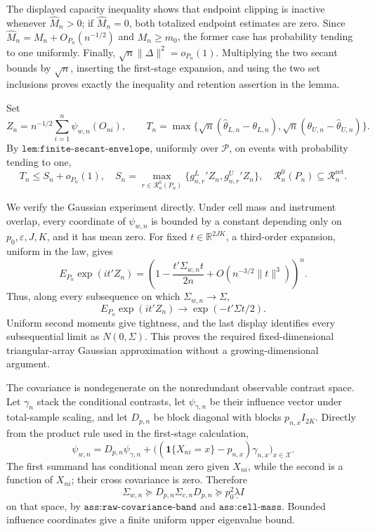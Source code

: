 The displayed capacity inequality shows that endpoint clipping is inactive whenever \(\widehat M_n>0\); if \(\widehat M_n=0\), both totalized endpoint estimates are zero. Since \(\widehat M_n=M_n+O_{P_n}(n^{-1/2})\) and \(M_n\ge m_0\), the former case has probability tending to one uniformly. Finally,
\(\sqrt n\lVert\Delta\rVert^2=o_{P_n}(1)\). Multiplying the two secant bounds by \(\sqrt n\), inserting the first-stage expansion, and using the two set inclusions proves exactly the inequality and retention assertion in the lemma.

Set
\[
 Z_n=n^{-1/2}\sum_{i=1}^n\psi_{w,n}(O_{ni}),
 \qquad
 T_n=\max\{\sqrt n(\widehat\theta_{L,n}-\theta_{L,n}),
              \sqrt n(\theta_{U,n}-\widehat\theta_{U,n})\}.
\]
By \(\texttt{lem:finite-secant-envelope}\), uniformly over \(\mathcal P\), on events with probability tending to one,
\[
 T_n\le S_n+o_{P_n}(1),
 \quad
 S_n=\max_{r\in\mathcal R_n^0(P_n)}
 \{g^L_{n,r}{}'Z_n,g^U_{n,r}{}'Z_n\},
 \quad
 \mathcal R_n^0(P_n)\subseteq\mathcal R_n^{\mathrm{ret}}.
\]

We verify the Gaussian experiment directly. Under cell mass and instrument overlap, every coordinate of \(\psi_{w,n}\) is bounded by a constant depending only on \(p_0,\varepsilon,J,K\), and it has mean zero. For fixed \(t\in\mathbb R^{2JK}\), a third-order expansion, uniform in the law, gives
\[
 E_{P_n}\exp(i t'Z_n)
 =\left(1-\frac{t'\Sigma_{w,n}t}{2n}
          +O(n^{-3/2}\lVert t\rVert^3)\right)^n.
\]
Thus, along every subsequence on which \(\Sigma_{w,n}\to\Sigma\),
\[
 E_{P_n}\exp(i t'Z_n)\longrightarrow
 \exp(-t'\Sigma t/2).
\]
Uniform second moments give tightness, and the last display identifies every subsequential limit as \(N(0,\Sigma)\). This proves the required fixed-dimensional triangular-array Gaussian approximation without a growing-dimensional argument.

The covariance is nondegenerate on the nonredundant observable contrast space. Let \(\gamma_n\) stack the conditional contrasts, let \(\psi_{\gamma,n}\) be their influence vector under total-sample scaling, and let \(D_{p,n}\) be block diagonal with blocks \(p_{n,x}I_{2K}\). Directly from the product rule used in the first-stage calculation,
\[
 \psi_{w,n}=D_{p,n}\psi_{\gamma,n}
 +\bigl((\mathbf1\{X_{ni}=x\}-p_{n,x})\gamma_{n,x}\bigr)_{x\in\mathcal X}.
\]
The first summand has conditional mean zero given \(X_{ni}\), while the second is a function of \(X_{ni}\); their cross covariance is zero. Therefore
\[
 \Sigma_{w,n}\succeq D_{p,n}\Sigma_{c,n}D_{p,n}
 \succeq p_0^2\underline\lambda I
\]
on that space, by \(\texttt{ass:raw-covariance-band}\) and \(\texttt{ass:cell-mass}\). Bounded influence coordinates give a finite uniform upper eigenvalue bound.

